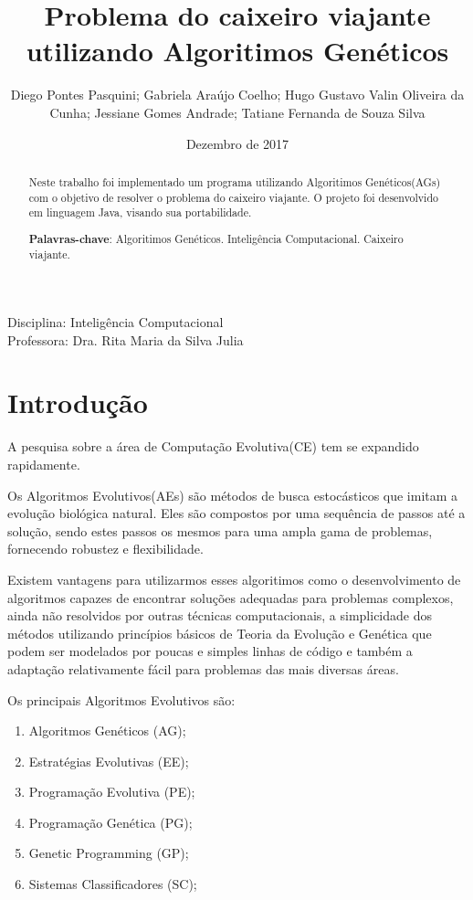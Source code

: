 \documentclass[
article,			%
11pt,				%
oneside,			%
a4paper,			%
english,			%
brazil,				%
sumario=tradicional
]{article}
\title{\textbf{Problema do caixeiro viajante utilizando Algoritimos Genéticos}}
\author{Diego Pontes Pasquini; Gabriela Araújo Coelho; Hugo Gustavo Valin Oliveira da Cunha; Jessiane Gomes Andrade; Tatiane Fernanda de Souza Silva}
\date{Dezembro de 2017}
\begin{document}
	
	\maketitle
	
	\begin{center}
		\small
		Disciplina: Inteligência Computacional \\
		\small
		Professora: Dra. Rita Maria da Silva Julia
	\end{center}
	
	\begin{abstract}
		Neste trabalho foi implementado um programa utilizando Algoritimos Genéticos(AGs) com o objetivo de resolver o problema do caixeiro viajante. O projeto foi desenvolvido em linguagem Java, visando sua portabilidade.  	
		\vspace{20px}
		
		\noindent
		\textbf{Palavras-chave}: Algoritimos Genéticos. Inteligência Computacional. Caixeiro viajante.
	\end{abstract}
	

	\section{Introdução}

	A pesquisa sobre a área de Computação Evolutiva(CE) tem se expandido rapidamente.
	
	Os Algoritmos Evolutivos(AEs) são métodos de busca estocásticos que imitam a evolução biológica natural. Eles são compostos por uma sequência de passos até a solução, sendo estes passos os mesmos para uma ampla gama de problemas, fornecendo robustez e flexibilidade.
	
	Existem vantagens para utilizarmos esses algoritimos como o desenvolvimento de algoritmos capazes de encontrar soluções adequadas para problemas complexos, ainda não resolvidos por outras técnicas computacionais, a simplicidade dos métodos utilizando princípios básicos de Teoria da Evolução e Genética que podem ser modelados por poucas e simples linhas de código e também a adaptação relativamente fácil para problemas das mais diversas áreas.

	Os principais Algoritmos Evolutivos são:
	\begin{enumerate}
		\item Algoritmos Genéticos (AG);
		\item Estratégias Evolutivas (EE);
		\item Programação Evolutiva (PE);
		\item Programação Genética (PG); 
		\item Genetic Programming (GP);
		\item Sistemas Classificadores (SC);
	\end{enumerate}
\end{document}
